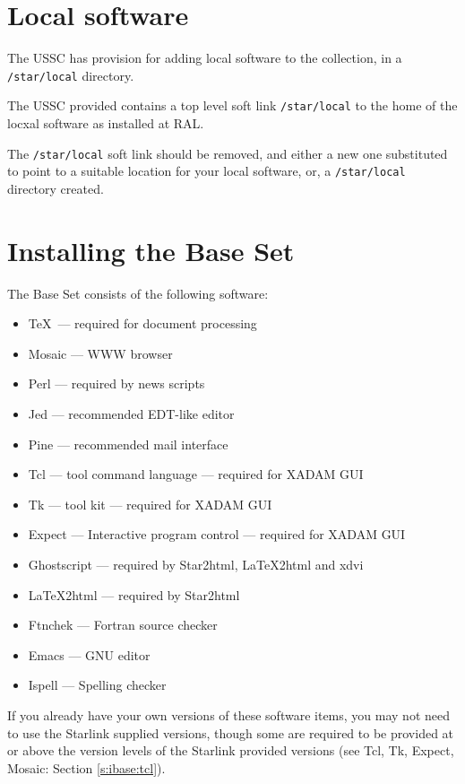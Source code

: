 \section{Local software}
\label{s:ilocal}

The USSC has provision for adding local software to the collection, in a
{\tt /star/local} directory.

The USSC provided contains a top level soft link {\tt /star/local}
to the home of the locxal software as installed at RAL.

The {\tt /star/local} soft link should be removed, and either a new
one substituted to point to a suitable location for your local
software, or, a {\tt /star/local} directory created.

\section{Installing the Base Set}
\label{s:ibase}

The Base Set consists of the following software:

\begin{itemize}
\item \TeX\   --- required for document processing
\item Mosaic  --- WWW browser
\item Perl  --- required by news scripts
\item Jed  --- recommended EDT-like editor
\item Pine --- recommended mail interface
\item Tcl --- tool command language --- required for XADAM GUI
\item Tk --- tool kit --- required for XADAM GUI
\item Expect --- Interactive program control --- required for XADAM GUI
\item Ghostscript --- required by Star2html, LaTeX2html and xdvi
\item LaTeX2html --- required by Star2html
\item Ftnchek --- Fortran source checker
\item Emacs --- GNU editor
\item Ispell --- Spelling checker
\end{itemize}

If you already have your own versions of these software items, you may not
need to use the Starlink supplied versions, though some are required to be
provided at or above the version levels of the Starlink provided versions
(see Tcl, Tk, Expect, Mosaic: Section \ref{s:ibase:tcl}).

